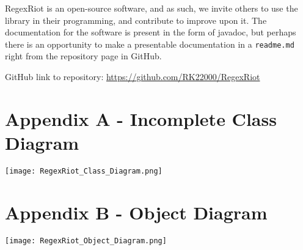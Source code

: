 \documentclass[conference]{IEEEtran}
\begin{document}
RegexRiot is an open-source software, and as such, we invite others to use the library
in their programming, and contribute to improve upon it. The documentation for
the software is present in the form of javadoc, but perhaps there is an
opportunity to make a presentable documentation in a \texttt{readme.md}
right from the repository page in GitHub.

GitHub link to repository: \url{https://github.com/RK22000/RegexRiot}




\onecolumn
\appendices
\section*{Appendix A - Incomplete Class Diagram}
\centering
\texttt{[image: RegexRiot\_Class\_Diagram.png]}
\label{appendix:classdiagram}

\section*{Appendix B - Object Diagram}
\centering
\texttt{[image: RegexRiot\_Object\_Diagram.png]}
\label{appendix:objdiagram}
\end{document}
